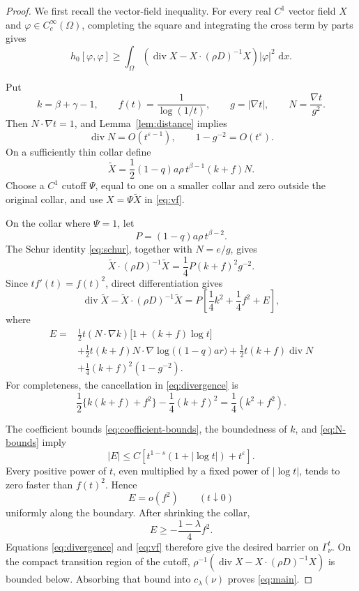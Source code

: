 \documentclass[11pt]{article}
\newcommand{\Om}{\Omega}
\newcommand{\dd}{\,\mathrm d}
\newcommand{\diver}{\operatorname{div}}
\newcommand{\Grad}{\nabla}
\newcommand{\eps}{\varepsilon}
\begin{document}
\begin{proof}
We first recall the vector-field inequality.  For every real \(C^1\) vector
field \(X\) and \(\varphi\in C_c^\infty(\Om)\), completing the square and
integrating the cross term by parts gives
\begin{equation}\label{eq:vf}
h_0[\varphi,\varphi]\geq
\int_\Om\left(\diver X-X\cdot(\rho D)^{-1}X\right)
|\varphi|^2\,\dd x.
\end{equation}

Put
\[
k=\beta+\gamma-1,\qquad
f(t)=\frac1{\log(1/t)},\qquad
g=|\Grad t|,\qquad
N=\frac{\Grad t}{g^2}.
\]
Then \(N\cdot\Grad t=1\), and Lemma~\ref{lem:distance} implies
\begin{equation}\label{eq:N-bounds}
\diver N=O(t^{\eps-1}),\qquad
1-g^{-2}=O(t^\eps).
\end{equation}
On a sufficiently thin collar define
\[
\widetilde X
=\frac12(1-q)a\rho\,t^{\beta-1}(k+f)N.
\]
Choose a \(C^1\) cutoff \(\Psi\), equal to one on a smaller collar and zero
outside the original collar, and use \(X=\Psi\widetilde X\) in
\eqref{eq:vf}.

On the collar where \(\Psi=1\), let
\[
P=(1-q)a\rho\,t^{\beta-2}.
\]
The Schur identity \eqref{eq:schur}, together with \(N=e/g\), gives
\begin{equation}\label{eq:quadratic}
\widetilde X\cdot(\rho D)^{-1}\widetilde X
=\frac14P(k+f)^2g^{-2}.
\end{equation}
Since \(tf'(t)=f(t)^2\), direct differentiation gives
\begin{equation}\label{eq:divergence}
\diver\widetilde X-\widetilde X\cdot(\rho D)^{-1}\widetilde X
=P\left[\frac14k^2+\frac14f^2+E\right],
\end{equation}
where
\begin{align}
E={}&
\frac12t(N\cdot\Grad k)
\bigl[1+(k+f)\log t\bigr] \nonumber\\
&+\frac12t(k+f)N\cdot\Grad\log\bigl((1-q)ar\bigr)
+\frac12t(k+f)\diver N \nonumber\\
&+\frac14(k+f)^2(1-g^{-2}).                         \label{eq:error}
\end{align}
For completeness, the cancellation in \eqref{eq:divergence} is
\[
\frac12\{k(k+f)+f^2\}-\frac14(k+f)^2
=\frac14(k^2+f^2).
\]

The coefficient bounds \eqref{eq:coefficient-bounds}, the boundedness of
\(k\), and \eqref{eq:N-bounds} imply
\begin{equation}\label{eq:error-bound}
|E|\leq C\left[t^{1-s}(1+|\log t|)+t^\eps\right].
\end{equation}
Every positive power of \(t\), even multiplied by a fixed power of
\(|\log t|\), tends to zero faster than \(f(t)^2\).  Hence
\[
E=o(f^2)\qquad(t\downarrow0)
\]
uniformly along the boundary.  After shrinking the collar,
\[
E\geq-\frac{1-\lambda}{4}f^2.
\]
Equations \eqref{eq:divergence} and \eqref{eq:vf} therefore give the desired
barrier on \(\Gamma_\nu^t\).  On the compact transition region of the cutoff,
\(\rho^{-1}(\diver X-X\cdot(\rho D)^{-1}X)\) is bounded below.  Absorbing
that bound into \(c_\lambda(\nu)\) proves \eqref{eq:main}.


\end{proof}
\end{document}
